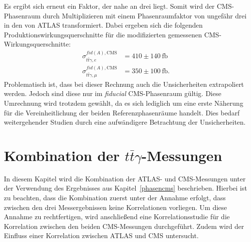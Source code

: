 Es ergibt sich erneut ein Faktor, der nahe an drei liegt. Somit wird der CMS-Phasenraum durch Multiplizieren mit einem Phasenraumfaktor von ungefähr drei in den von ATLAS transformiert. Dabei ergeben sich die folgenden Produktionswirkungsquerschnitte für die modifizierten gemessenen CMS-Wirkungsquerschnitte:
\begin{align}
  \sigma^{fid(A), \text{CMS}}_{t\bar{t}\gamma, e} &= 410 \pm 140~ \si{\femto\barn}\\
  \sigma^{fid(A), \text{CMS}}_{t\bar{t}\gamma, \mu} &= 350 \pm 100~ \si{\femto\barn}.
\end{align}
Problematisch ist, dass bei dieser Rechnung auch die Unsicherheiten extrapoliert werden. Jedoch sind diese nur im \textit{fiducial} CMS-Phasenraum gültig. Diese Umrechnung wird trotzdem gewählt, da es sich lediglich um eine erste Näherung für die Vereinheitlichung der beiden Referenzphasenräume handelt. Dies bedarf weitergehender Studien durch eine aufwändigere Betrachtung der Unsicherheiten.
%
%
\chapter{Kombination der \texorpdfstring {$t\bar{t}\gamma$}{math}-Messungen}
In diesem Kapitel wird die Kombination der ATLAS- und CMS-Messungen unter der Verwendung des Ergebnisses aus Kapitel~\ref{phasencms} beschrieben. Hierbei ist zu beachten, dass die Kombination zuerst unter der Annahme erfolgt, dass zwischen den drei Messergebnissen keine Korrelationen vorliegen. Um diese Annahme zu rechtfertigen, wird anschließend eine Korrelationsstudie für die Korrelation zwischen den beiden CMS-Messungen durchgeführt. Zudem wird der Einfluss einer Korrelation zwischen ATLAS und CMS untersucht.

